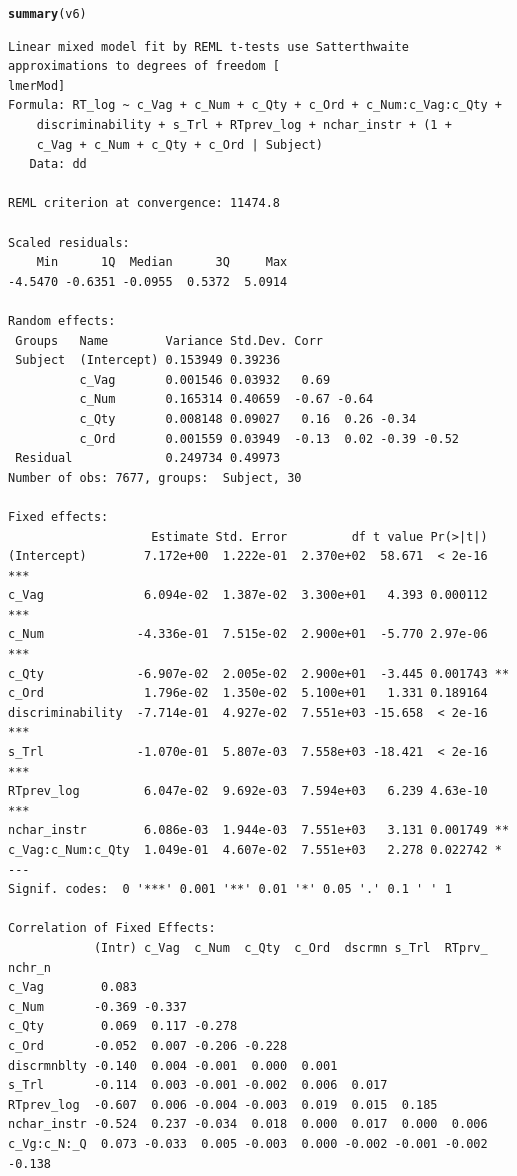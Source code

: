 \documentclass[a4paper,12pt]{article}\usepackage[]{graphicx}\usepackage[]{color}
\makeatletter
\newcommand{\hlstd}[1]{\textcolor[rgb]{0.345,0.345,0.345}{#1}}%
\newcommand{\hlkwd}[1]{\textcolor[rgb]{0.737,0.353,0.396}{\textbf{#1}}}%
\newenvironment{kframe}{%
 \def\at@end@of@kframe{}%
 \ifinner\ifhmode%
  \def\at@end@of@kframe{\end{minipage}}%
  \begin{minipage}{\columnwidth}%
 \fi\fi%
 \def\FrameCommand##1{\hskip\@totalleftmargin \hskip-\fboxsep
 \colorbox{shadecolor}{##1}\hskip-\fboxsep
     \hskip-\linewidth \hskip-\@totalleftmargin \hskip\columnwidth}%
 \MakeFramed {\advance\hsize-\width
   \@totalleftmargin\z@ \linewidth\hsize
   \@setminipage}}%
 {\par\unskip\endMakeFramed%
 \at@end@of@kframe}
\newenvironment{knitrout}{}{} %
\makeatother
\begin{document}
\begin{knitrout}\scriptsize
{}\color{fgcolor}\begin{kframe}
\begin{alltt}
\hlkwd{summary}\hlstd{(v6)}
\end{alltt}
\begin{verbatim}
Linear mixed model fit by REML t-tests use Satterthwaite approximations to degrees of freedom [
lmerMod]
Formula: RT_log ~ c_Vag + c_Num + c_Qty + c_Ord + c_Num:c_Vag:c_Qty +  
    discriminability + s_Trl + RTprev_log + nchar_instr + (1 +  
    c_Vag + c_Num + c_Qty + c_Ord | Subject)
   Data: dd

REML criterion at convergence: 11474.8

Scaled residuals: 
    Min      1Q  Median      3Q     Max 
-4.5470 -0.6351 -0.0955  0.5372  5.0914 

Random effects:
 Groups   Name        Variance Std.Dev. Corr                   
 Subject  (Intercept) 0.153949 0.39236                         
          c_Vag       0.001546 0.03932   0.69                  
          c_Num       0.165314 0.40659  -0.67 -0.64            
          c_Qty       0.008148 0.09027   0.16  0.26 -0.34      
          c_Ord       0.001559 0.03949  -0.13  0.02 -0.39 -0.52
 Residual             0.249734 0.49973                         
Number of obs: 7677, groups:  Subject, 30

Fixed effects:
                    Estimate Std. Error         df t value Pr(>|t|)    
(Intercept)        7.172e+00  1.222e-01  2.370e+02  58.671  < 2e-16 ***
c_Vag              6.094e-02  1.387e-02  3.300e+01   4.393 0.000112 ***
c_Num             -4.336e-01  7.515e-02  2.900e+01  -5.770 2.97e-06 ***
c_Qty             -6.907e-02  2.005e-02  2.900e+01  -3.445 0.001743 ** 
c_Ord              1.796e-02  1.350e-02  5.100e+01   1.331 0.189164    
discriminability  -7.714e-01  4.927e-02  7.551e+03 -15.658  < 2e-16 ***
s_Trl             -1.070e-01  5.807e-03  7.558e+03 -18.421  < 2e-16 ***
RTprev_log         6.047e-02  9.692e-03  7.594e+03   6.239 4.63e-10 ***
nchar_instr        6.086e-03  1.944e-03  7.551e+03   3.131 0.001749 ** 
c_Vag:c_Num:c_Qty  1.049e-01  4.607e-02  7.551e+03   2.278 0.022742 *  
---
Signif. codes:  0 '***' 0.001 '**' 0.01 '*' 0.05 '.' 0.1 ' ' 1

Correlation of Fixed Effects:
            (Intr) c_Vag  c_Num  c_Qty  c_Ord  dscrmn s_Trl  RTprv_ nchr_n
c_Vag        0.083                                                        
c_Num       -0.369 -0.337                                                 
c_Qty        0.069  0.117 -0.278                                          
c_Ord       -0.052  0.007 -0.206 -0.228                                   
discrmnblty -0.140  0.004 -0.001  0.000  0.001                            
s_Trl       -0.114  0.003 -0.001 -0.002  0.006  0.017                     
RTprev_log  -0.607  0.006 -0.004 -0.003  0.019  0.015  0.185              
nchar_instr -0.524  0.237 -0.034  0.018  0.000  0.017  0.000  0.006       
c_Vg:c_N:_Q  0.073 -0.033  0.005 -0.003  0.000 -0.002 -0.001 -0.002 -0.138
\end{verbatim}
\end{kframe}
\end{knitrout}
\end{document}
